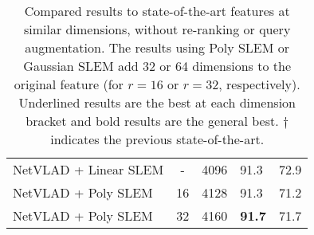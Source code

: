 \begin{table}[t]
\begin{center}
\begin{tabular}{l|c|c|ll}
NetVLAD + Linear SLEM & - & 4096 & 91.3 & 72.9 \\
NetVLAD + Poly SLEM & 16 & 4128 & 91.3 & 71.2 \\
NetVLAD + Poly SLEM & 32 & 4160 & \bf{91.7} & 71.7 \\
\hline 
\end{tabular}
\caption{Compared results to state-of-the-art features at similar dimensions, without re-ranking or query augmentation. The results using Poly SLEM or Gaussian SLEM add 32 or 64 dimensions to the original feature (for $r=16$ or $r=32$, respectively). Underlined results are the best at each dimension bracket and bold results are the general best. $\dag$ indicates the previous state-of-the-art.}
\label{sota}
\end{center}
\end{table}



